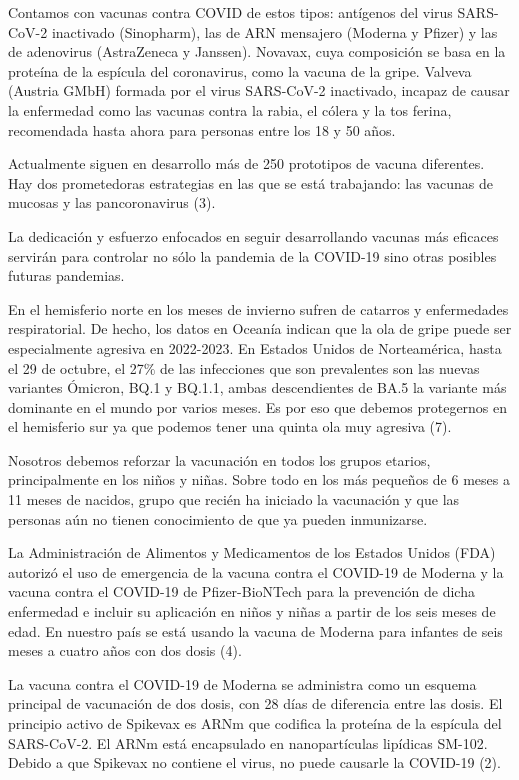 \documentclass[12pt,a4paper,openany]{book}
\begin{document}
 Contamos con vacunas contra COVID de estos tipos: antígenos del virus SARS-CoV-2 inactivado (Sinopharm), las de ARN mensajero (Moderna y Pfizer) y las de adenovirus (AstraZeneca y Janssen). Novavax, cuya composición se basa en la proteína de la espícula del coronavirus, como la vacuna de la gripe. Valveva (Austria GMbH) formada por el virus SARS-CoV-2 inactivado, incapaz de causar la enfermedad como las vacunas contra la rabia, el cólera y la tos ferina, recomendada hasta ahora para personas entre los 18 y 50 años.
 
 Actualmente siguen en desarrollo más de 250 prototipos de vacuna diferentes. Hay dos prometedoras estrategias en las que se está trabajando: las vacunas de mucosas y las pancoronavirus (3).
 
 La dedicación y esfuerzo enfocados en seguir desarrollando vacunas más eficaces servirán para controlar no sólo la pandemia de la COVID-19 sino otras posibles futuras pandemias.
 
 En el hemisferio norte en los meses de invierno sufren de catarros y enfermedades respiratorial. De hecho, los datos en Oceanía indican que la ola de gripe puede ser especialmente agresiva en 2022-2023. En Estados Unidos de Norteamérica, hasta el 29 de octubre, el 27$\%$ de las infecciones que son prevalentes son las nuevas variantes Ómicron, BQ.1 y BQ.1.1, ambas descendientes de BA.5 la variante más dominante en el mundo por varios meses. Es por eso que debemos protegernos en el hemisferio sur ya que podemos tener una quinta ola muy agresiva (7).
 
 Nosotros debemos reforzar la vacunación en todos los grupos etarios, principalmente en los niños y niñas. Sobre todo en los más pequeños de 6 meses a 11 meses de nacidos, grupo que recién ha iniciado la vacunación y que las personas aún no tienen conocimiento de que ya pueden inmunizarse.
 
 La Administración de Alimentos y Medicamentos de los Estados Unidos (FDA) autorizó el uso de emergencia de la vacuna contra el COVID-19 de Moderna y la vacuna contra el COVID-19 de Pfizer-BioNTech para la prevención de dicha enfermedad e incluir su aplicación en niños y niñas a partir de los seis meses de edad. En nuestro país se está usando la vacuna de Moderna para infantes de seis meses a cuatro años con dos dosis (4).
 
 La vacuna contra el COVID-19 de Moderna se administra como un esquema principal de vacunación de dos dosis, con 28 días de diferencia entre las dosis. El principio activo de Spikevax es ARNm que codifica la proteína de la espícula del SARS-CoV-2. El ARNm está encapsulado en nanopartículas lipídicas SM-102. Debido a que Spikevax no contiene el virus, no puede causarle la COVID-19 (2).
 
\end{document}
